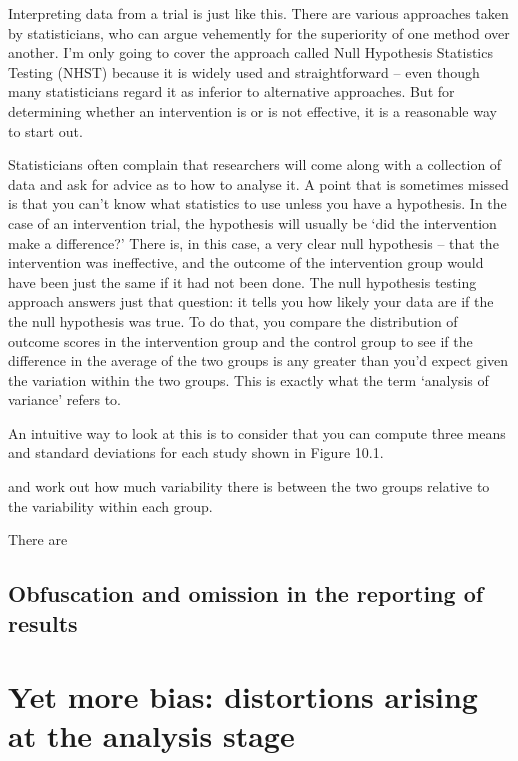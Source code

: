 \documentclass[]{book}
\begin{document}
Interpreting data from a trial is just like this. There are various approaches taken by statisticians, who can argue vehemently for the superiority of one method over another. I'm only going to cover the approach called Null Hypothesis Statistics Testing (NHST) because it is widely used and straightforward -- even though many statisticians regard it as inferior to alternative approaches. But for determining whether an intervention is or is not effective, it is a reasonable way to start out.

Statisticians often complain that researchers will come along with a collection of data and ask for advice as to how to analyse it. A point that is sometimes missed is that you can't know what statistics to use unless you have a hypothesis. In the case of an intervention trial, the hypothesis will usually be `did the intervention make a difference?' There is, in this case, a very clear null hypothesis -- that the intervention was ineffective, and the outcome of the intervention group would have been just the same if it had not been done. The null hypothesis testing approach answers just that question: it tells you how likely your data are if the the null hypothesis was true. To do that, you compare the distribution of outcome scores in the intervention group and the control group to see if the difference in the average of the two groups is any greater than you'd expect given the variation within the two groups. This is exactly what the term `analysis of variance' refers to.

An intuitive way to look at this is to consider that you can compute three means and standard deviations for each study shown in Figure 10.1.

and work out how much variability there is between the two groups relative to the variability within each group.

There are

\hypertarget{obfuscation-and-omission-in-the-reporting-of-results}{%
\section{Obfuscation and omission in the reporting of results}\label{obfuscation-and-omission-in-the-reporting-of-results}}

\hypertarget{yet-more-bias-distortions-arising-at-the-analysis-stage}{%
\chapter{Yet more bias: distortions arising at the analysis stage}\label{yet-more-bias-distortions-arising-at-the-analysis-stage}}
\end{document}
